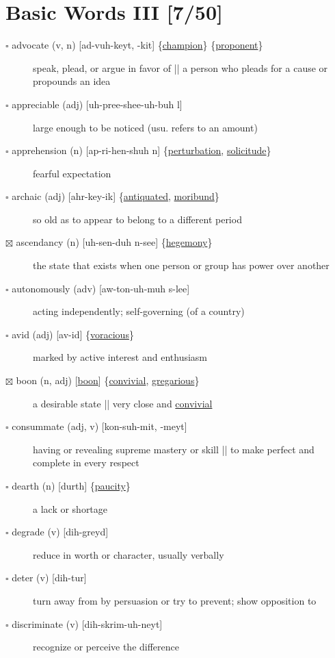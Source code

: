 \documentclass[11pt]{article}
\begin{document}
\section{Basic Words III [7/50]}
\label{sec:orgf29863f}
\begin{description}
\item[{$\square$ \label{org63e2995}advocate (v, n) [ad-vuh-keyt, -kit] \{\hyperref[orgaa86f17]{champion}\} \{\hyperref[org8c77071]{proponent}\}}] speak, plead, or argue in favor of || a person who pleads for a cause or propounds an idea
\item[{$\square$ appreciable (adj) [uh-pree-shee-uh-buh l]}] large enough to be noticed (usu. refers to an amount)
\item[{$\square$ \label{org85469d5}apprehension (n) [ap-ri-hen-shuh n] \{\hyperref[orgd8eddee]{perturbation}, \hyperref[org0889008]{solicitude}\}}] fearful expectation
\item[{$\square$ \label{orge2aa941}archaic (adj) [ahr-key-ik] \{\hyperref[org770b44b]{antiquated}, \hyperref[orga846e6f]{moribund}\}}] so old as to appear to belong to a different period
\item[{$\boxtimes$ \label{org61dbb17}ascendancy (n) [uh-sen-duh n-see] \{\hyperref[org6f72524]{hegemony}\}}] the state that exists when one person or group has power over another
\item[{$\square$ autonomously (adv) [aw-ton-uh-muh s-lee]}] acting independently; self-governing (of a country)
\item[{$\square$ \label{org671f6ae}avid (adj) [av-id] \{\hyperref[org96629dc]{voracious}\}}] marked by active interest and enthusiasm
\item[{$\boxtimes$ \label{org2311542}boon (n, adj) [\hyperref[org2311542]{boon}] \{\hyperref[org12e2a2b]{convivial}, \hyperref[orgdebaeb2]{gregarious}\}}] a desirable state || very close and \hyperref[org12e2a2b]{convivial}
\item[{$\square$ consummate (adj, v) [kon-suh-mit, -meyt]}] having or revealing supreme mastery or skill || to make perfect and complete in every respect
\item[{$\square$ \label{org4805f17}dearth (n) [durth] \{\hyperref[org77e3ca7]{paucity}\}}] a lack or shortage
\item[{$\square$ degrade (v) [dih-greyd]}] reduce in worth or character, usually verbally
\item[{$\square$ deter (v) [dih-tur]}] turn away from by persuasion or try to prevent; show opposition to
\item[{$\square$ discriminate (v) [dih-skrim-uh-neyt]}] recognize or perceive the difference

\end{description}
\end{document}
